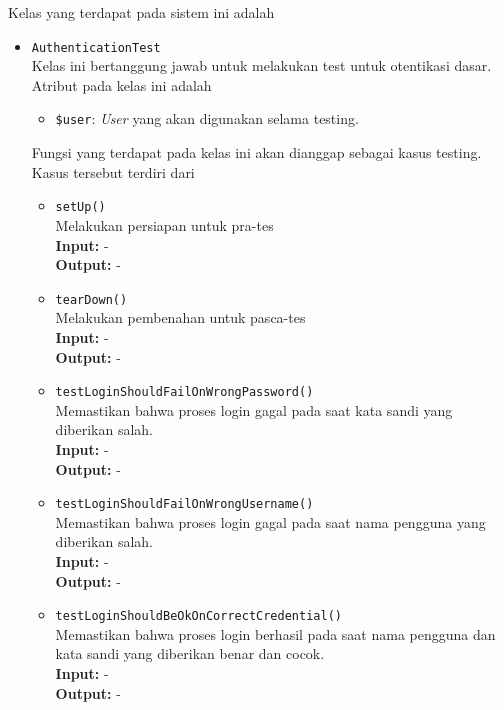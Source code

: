    Kelas yang terdapat pada sistem ini adalah
    \begin{itemize}
        \item \texttt{AuthenticationTest} \\
            Kelas ini bertanggung jawab untuk melakukan test untuk otentikasi dasar.
            Atribut pada kelas ini adalah
            \begin{itemize}
                \item \texttt{\$user}: \textit{User} yang akan digunakan selama testing.
            \end{itemize}
            Fungsi yang terdapat pada kelas ini akan dianggap sebagai kasus testing. Kasus
            tersebut terdiri dari
            \begin{itemize}
                \item \texttt{setUp()} \\
                    Melakukan persiapan untuk pra-tes \\
                    \textbf{Input:} -\\
                    \textbf{Output:} -
                
                \item \texttt{tearDown()} \\
                    Melakukan pembenahan untuk pasca-tes \\
                    \textbf{Input:} - \\
                    \textbf{Output:} -
                
                \item \texttt{testLoginShouldFailOnWrongPassword()} \\
                    Memastikan bahwa proses login gagal pada saat kata sandi yang diberikan
                    salah. \\
                    \textbf{Input:} - \\
                    \textbf{Output:} -
                
                \item \texttt{testLoginShouldFailOnWrongUsername()} \\
                    Memastikan bahwa proses login gagal pada saat nama pengguna yang diberikan
                    salah. \\
                    \textbf{Input:} - \\
                    \textbf{Output:} -
                
                \item \texttt{testLoginShouldBeOkOnCorrectCredential()} \\
                    Memastikan bahwa proses login berhasil pada saat nama pengguna dan kata
                    sandi yang diberikan benar dan cocok.\\
                    \textbf{Input:} - \\
                    \textbf{Output:} -
            \end{itemize}
            

\end{itemize}
